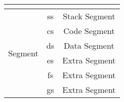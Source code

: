 \documentclass[11pt,a5paper,footinclude=true,headinclude=true]{scrbook} %
\begin{document}
\begin{center}
\begin{tabular}{|c|c|c|c|}
                                        & \multicolumn{2}{c|}{} & \\
        \hline
        \multirow{6}{*}{Segment}        & \multicolumn{2}{c|}{ss} & Stack Segment \\
                                        \cline{2-4}
                                        & \multicolumn{2}{c|}{cs} & Code Segment \\
                                        \cline{2-4}
                                        & \multicolumn{2}{c|}{ds} & Data Segment \\
                                        \cline{2-4}
                                        & \multicolumn{2}{c|}{es} & Extra Segment \\
                                        \cline{2-4}
                                        & \multicolumn{2}{c|}{fs} & Extra Segment \\
                                        \cline{2-4}
                                        & \multicolumn{2}{c|}{gs} & Extra Segment \\
        \hline
    \end{tabular}
\end{center}
\end{document}
